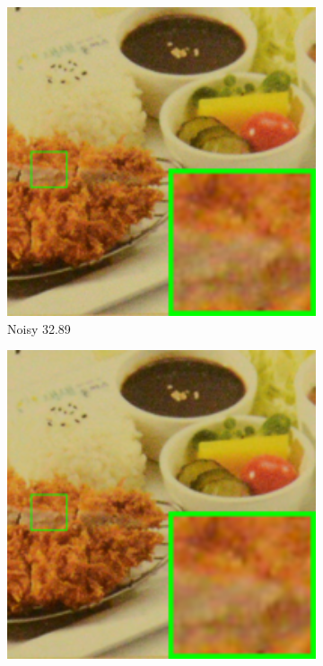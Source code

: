 \begin{figure}
    \centering
    \begin{subfigure}[t]{0.19\textwidth}
        \centering
        \includegraphics[width=1\textwidth]{images/mcwnnm/cc/resize_br_Noisy_d800_iso3200_2.png}
		\caption{Noisy 32.89}
    \end{subfigure}
    \hfill
    \begin{subfigure}[t]{0.19\textwidth}
        \centering
        \includegraphics[width=1\textwidth]{images/mcwnnm/cc/resize_br_CBM3D_CC15_d800_iso3200_2.png}

\end{subfigure}
\end{figure}
